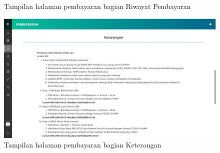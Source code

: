 \begin{enumerate}
\begin{figure}[H]
		\caption{Tampilan halaman pembayaran bagian Riwayat Pembayaran} 
		\label{fig:riw_2018}
	\end{figure}
	\begin{figure}[H]
		\centering
		\includegraphics[scale=0.7]{Gambar/keterangan2018.jpg}
		\caption{Tampilan halaman pembayaran bagian Keterangan} 
		\label{fig:ketbayar_2018}
	\end{figure}


\end{enumerate}
